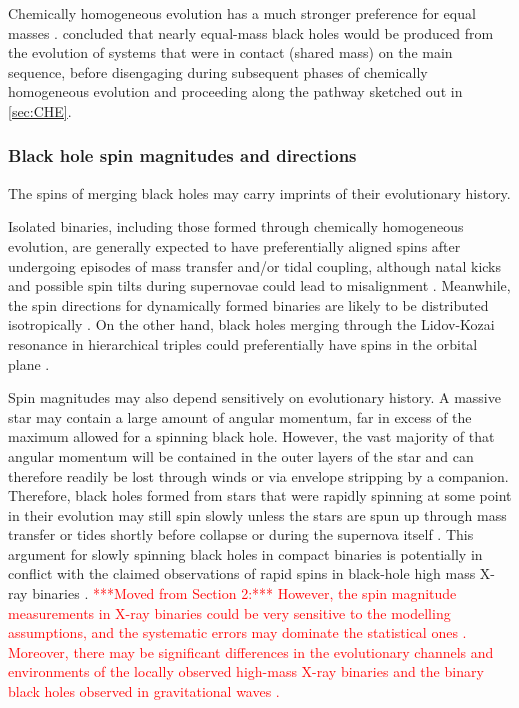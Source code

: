 \documentclass[iop,onecolumn]{revtex4}
\newcommand{\ajf}[1]{\textcolor{red}{#1}}
\begin{document}
Chemically homogeneous evolution has a much stronger preference for equal masses \citep{MandeldeMink:2016}.  \citet{Marchant:2016} concluded that nearly equal-mass black holes would be produced from the evolution of systems that were in contact (shared mass) on the main sequence, before disengaging during subsequent phases of chemically homogeneous evolution and proceeding along the pathway sketched out in \autoref{sec:CHE}. 

\subsubsection{Black hole spin magnitudes and directions}
The spins of merging black holes may carry imprints of their evolutionary history. 

Isolated binaries, including those formed through chemically homogeneous evolution, are generally expected to have preferentially aligned spins after undergoing episodes of mass transfer and/or tidal coupling, although natal kicks and possible spin tilts during supernovae could lead to misalignment \citep[e.g.,][]{Farr:2011,Tauris:2017}.  Meanwhile, the spin directions for dynamically formed binaries are likely to be distributed isotropically \citep[e.g.,][]{Rodriguez:2016spin}.  On the other hand, black holes merging through the Lidov-Kozai resonance in hierarchical triples could preferentially have spins in the orbital plane \citep{LiuLai:2018,RodriguezAntonini:2018}.

Spin magnitudes may also depend sensitively on evolutionary history.  A massive star may contain a large amount of angular momentum, far in excess of the maximum allowed for a spinning black hole. However, the vast majority of that angular momentum will be contained in the outer layers of the star and can therefore readily be lost through winds or via envelope stripping by a companion.  Therefore, black holes formed from stars that were rapidly spinning at some point in their evolution may still spin slowly unless the stars are spun up through mass transfer or tides shortly before collapse \citep{Kushnir:2016,HotokezakaPiran:2017,Zaldarriaga:2017} or during the supernova itself \citep{Batta:2017,Schroeder:2018}.   This argument for slowly spinning black holes in compact binaries is potentially in conflict with the claimed observations of rapid spins in black-hole high mass X-ray binaries \citep{MillerMiller:2015}. \ajf{***Moved from Section 2:*** However, the spin magnitude measurements in X-ray binaries could be very sensitive to the modelling assumptions, and the systematic errors may dominate the statistical ones \citep[e.g.,][]{Basak:2017,Kawano:2017}. Moreover, there may be significant differences in the evolutionary channels and environments of the locally observed high-mass X-ray binaries and the binary black holes observed in gravitational waves \citep[][and see \autoref{environ}]{HotokezakaPiran:2017}.}
\end{document}
